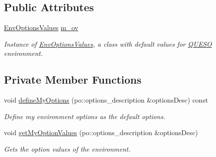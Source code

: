 \subsection*{Public Attributes}
\begin{DoxyCompactItemize}
\item 
\hyperlink{class_q_u_e_s_o_1_1_env_options_values}{Env\-Options\-Values} \hyperlink{class_q_u_e_s_o_1_1_environment_options_a97de0e8029b2d567643ab2b1b6ba2b9c}{m\-\_\-ov}
\begin{DoxyCompactList}\small\item\em Instance of \hyperlink{class_q_u_e_s_o_1_1_env_options_values}{Env\-Options\-Values}, a class with default values for \hyperlink{namespace_q_u_e_s_o}{Q\-U\-E\-S\-O} environment. \end{DoxyCompactList}\end{DoxyCompactItemize}
\subsection*{Private Member Functions}
\begin{DoxyCompactItemize}
\item 
void \hyperlink{class_q_u_e_s_o_1_1_environment_options_a6a23693c53621a33328191ffbe638e9a}{define\-My\-Options} (po\-::options\-\_\-description \&options\-Desc) const 
\begin{DoxyCompactList}\small\item\em Define my environment options as the default options. \end{DoxyCompactList}\item 
void \hyperlink{class_q_u_e_s_o_1_1_environment_options_af566b38203f16e418bd82942071aa639}{get\-My\-Option\-Values} (po\-::options\-\_\-description \&options\-Desc)
\begin{DoxyCompactList}\small\item\em Gets the option values of the environment. \end{DoxyCompactList}\end{DoxyCompactItemize}
